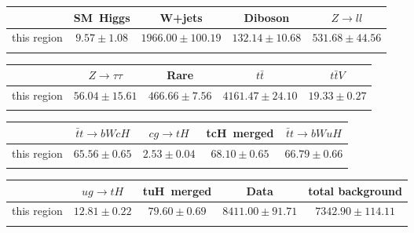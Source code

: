 \centering
\begin{tabular}{ccccc} \toprule\toprule
 & SM~Higgs & W+jets & Diboson & $Z\to ll$\\\midrule
this region & $9.57\pm1.08$ & $1966.00\pm100.19$ & $132.14\pm10.68$ & $531.68\pm44.56$\\
\bottomrule\bottomrule\\
\end{tabular}
\begin{tabular}{ccccc} \toprule\toprule
 & $Z\to \tau\tau$ & Rare & $t\bar{t}$ & $t\bar{t}V$\\\midrule
this region & $56.04\pm15.61$ & $466.66\pm7.56$ & $4161.47\pm24.10$ & $19.33\pm0.27$\\
\bottomrule\bottomrule\\
\end{tabular}
\begin{tabular}{ccccc} \toprule\toprule
 & $\bar{t}t\to bWcH$ & $cg\to tH$ & tcH~merged & $\bar{t}t\to bWuH$\\\midrule
this region & $65.56\pm0.65$ & $2.53\pm0.04$ & $68.10\pm0.65$ & $66.79\pm0.66$\\
\bottomrule\bottomrule\\
\end{tabular}
\begin{tabular}{ccccc} \toprule\toprule
 & $ug\to tH$ & tuH~merged & Data & total background\\\midrule
this region & $12.81\pm0.22$ & $79.60\pm0.69$ & $8411.00\pm91.71$ & $7342.90\pm114.11$\\
\bottomrule\bottomrule\\
\end{tabular}

